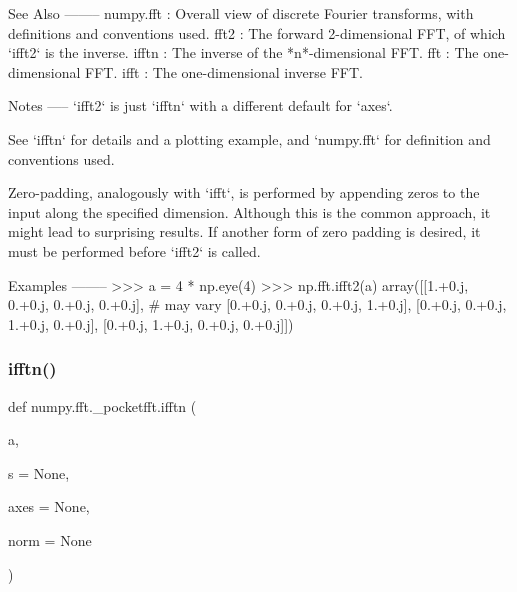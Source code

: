 \begin{DoxyVerb}
See Also
--------
numpy.fft : Overall view of discrete Fourier transforms, with definitions
     and conventions used.
fft2 : The forward 2-dimensional FFT, of which `ifft2` is the inverse.
ifftn : The inverse of the *n*-dimensional FFT.
fft : The one-dimensional FFT.
ifft : The one-dimensional inverse FFT.

Notes
-----
`ifft2` is just `ifftn` with a different default for `axes`.

See `ifftn` for details and a plotting example, and `numpy.fft` for
definition and conventions used.

Zero-padding, analogously with `ifft`, is performed by appending zeros to
the input along the specified dimension.  Although this is the common
approach, it might lead to surprising results.  If another form of zero
padding is desired, it must be performed before `ifft2` is called.

Examples
--------
>>> a = 4 * np.eye(4)
>>> np.fft.ifft2(a)
array([[1.+0.j,  0.+0.j,  0.+0.j,  0.+0.j], # may vary
       [0.+0.j,  0.+0.j,  0.+0.j,  1.+0.j],
       [0.+0.j,  0.+0.j,  1.+0.j,  0.+0.j],
       [0.+0.j,  1.+0.j,  0.+0.j,  0.+0.j]])\end{DoxyVerb}
 \mbox{\label{namespacenumpy_1_1fft_1_1__pocketfft_a3131f46333aa203c817efbca1a750913}} 
\subsubsection{\texorpdfstring{ifftn()}{ifftn()}}
{\footnotesize\ttfamily def numpy.\+fft.\+\_\+pocketfft.\+ifftn (\begin{DoxyParamCaption}\item[{}]{a,  }\item[{}]{s = {\ttfamily None},  }\item[{}]{axes = {\ttfamily None},  }\item[{}]{norm = {\ttfamily None} }\end{DoxyParamCaption})}

